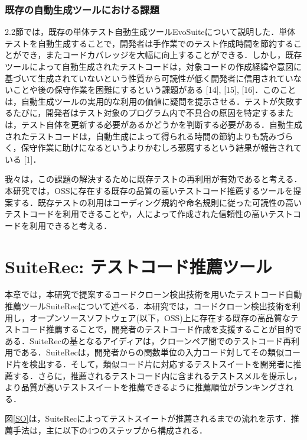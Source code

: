 \documentclass[12pt]{jarticle} %
\begin{document}
\subsubsection{既存の自動生成ツールにおける課題}

2.2節では，既存の単体テスト自動生成ツールEvoSuiteについて説明した．単体テストを自動生成することで，開発者は手作業でのテスト作成時間を節約することができ，またコードカバレッジを大幅に向上することができる．しかし，既存ツールによって自動生成されたテストコードは，対象コードの作成経緯や意図に基づいて生成されていないという性質から可読性が低く開発者に信用されていないことや後の保守作業を困難にするという課題がある [14], [15], [16]．このことは，自動生成ツールの実用的な利用の価値に疑問を提示させる．テストが失敗するたびに，開発者はテスト対象のプログラム内で不具合の原因を特定するまたは，テスト自体を更新する必要があるかどうかを判断する必要がある．自動生成されたテストコードは，自動生成によって得られる時間の節約よりも読みづらく，保守作業に助けになるというよりかむしろ邪魔するという結果が報告されている [1]．

我々は，この課題の解決するために既存テストの再利用が有効であると考える．本研究では，OSSに存在する既存の品質の高いテストコード推薦するツールを提案する．既存テストの利用はコーディング規約や命名規則に従った可読性の高いテストコードを利用できることや，人によって作成された信頼性の高いテストコードを利用できると考える．



\section{SuiteRec: テストコード推薦ツール}

本章では，本研究で提案するコードクローン検出技術を用いたテストコード自動推薦ツール{\sf SuiteRec}について述べる．本研究では，コードクローン検出技術を利用し，オープンソースソフトウェア(以下，OSS)上に存在する既存の高品質なテストコード推薦することで，開発者のテストコード作成を支援することが目的である．{\sf SuiteRec}の基となるアイディアは，クローンペア間でのテストコード再利用である．{\sf SuiteRec}は，開発者からの関数単位の入力コード対してその類似コード片を検出する．そして，類似コード片に対応するテストスイートを開発者に推薦する．さらに，推薦されるテストコード内に含まれるテストスメルを提示し，より品質が高いテストスイートを推薦できるように推薦順位がランキングされる．

図\ref{SO}は，SuiteRecによってテストスイートが推薦されるまでの流れを示す．推薦手法は，主に以下の4つのステップから構成される．
\end{document}
